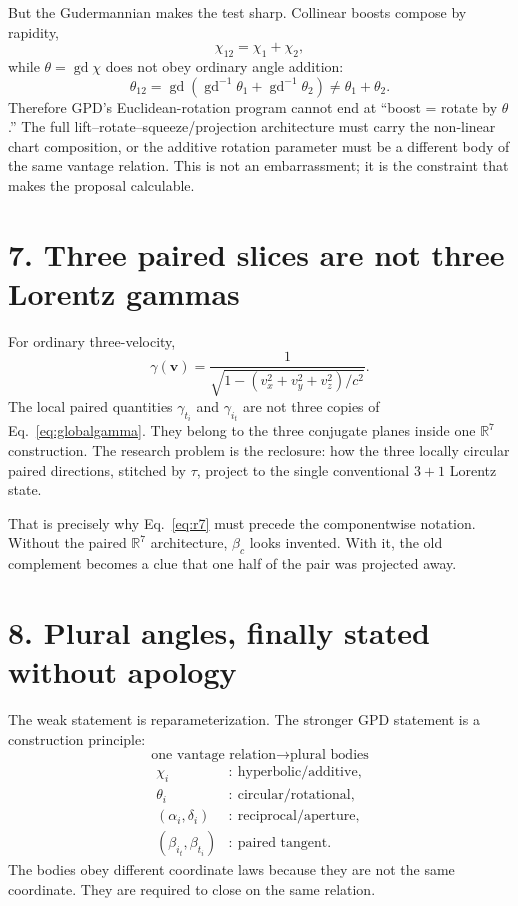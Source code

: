 \documentclass[8pt,twocolumn]{extarticle}
\DeclareMathOperator{\gd}{gd}
\newcommand{\R}{\mathbb{R}}
\begin{document}
But the Gudermannian makes the test sharp. Collinear boosts compose by
rapidity,
\begin{equation}
\chi_{12}=\chi_1+\chi_2,
\end{equation}
while $\theta=\gd\chi$ does not obey ordinary angle addition:
\begin{equation}
\theta_{12}
=
\gd\!\left(\gd^{-1}\theta_1+\gd^{-1}\theta_2\right)
\neq \theta_1+\theta_2.
\label{eq:composition}
\end{equation}
Therefore GPD's Euclidean-rotation program cannot end at ``boost = rotate by
$\theta$.'' The full lift--rotate--squeeze/projection architecture must carry
the non-linear chart composition, or the additive rotation parameter must be
a different body of the same vantage relation. This is not an embarrassment;
it is the constraint that makes the proposal calculable.

\section*{7. Three paired slices are not three Lorentz gammas}

For ordinary three-velocity,
\begin{equation}
\gamma(\mathbf v)
=
\frac{1}{\sqrt{1-(v_x^2+v_y^2+v_z^2)/c^2}}.
\label{eq:globalgamma}
\end{equation}
The local paired quantities $\gamma_{t_i}$ and $\gamma_{i_t}$ are not three
copies of Eq.~\eqref{eq:globalgamma}. They belong to the three conjugate
planes inside one $\R^7$ construction. The research problem is the reclosure:
how the three locally circular paired directions, stitched by $\tau$, project
to the single conventional $3+1$ Lorentz state.

That is precisely why Eq.~\eqref{eq:r7} must precede the componentwise
notation. Without the paired $\R^7$ architecture, $\beta_c$ looks invented.
With it, the old complement becomes a clue that one half of the pair was
projected away.

\section*{8. Plural angles, finally stated without apology}

The weak statement is reparameterization. The stronger GPD statement is a
construction principle:
\begin{equation}
\boxed{\text{one vantage relation}\longrightarrow\text{plural bodies}}
\label{eq:plural}
\end{equation}
\vspace{-0.5em}
\begin{align*}
\chi_i &:\ \text{hyperbolic/additive},\\
\theta_i &:\ \text{circular/rotational},\\
(\alpha_i,\delta_i) &:\ \text{reciprocal/aperture},\\
(\beta_{i_t},\beta_{t_i}) &:\ \text{paired tangent}.
\end{align*}
The bodies obey different coordinate laws because they are not the same
coordinate. They are required to close on the same relation.
\end{document}
